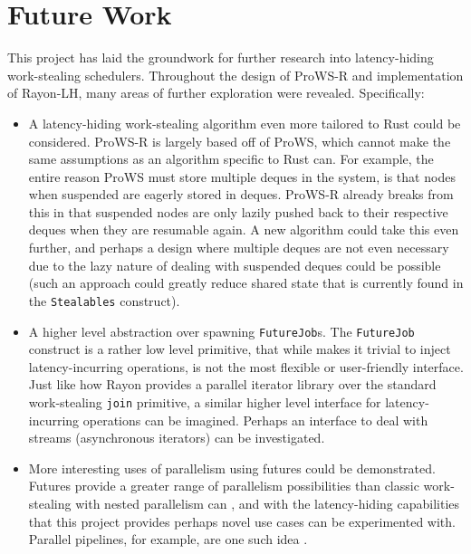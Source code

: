 \documentclass[bsc,frontabs,singlespacing,parskip,deptreport,normalheadings]{infthesis}
\begin{document}
\section{Future Work}

This project has laid the groundwork for further research into latency-hiding
work-stealing schedulers. Throughout the design of ProWS-R and implementation of
Rayon-LH, many areas of further exploration were revealed. Specifically:

\begin{itemize}
    \item A latency-hiding work-stealing algorithm even more tailored to Rust
        could be considered. ProWS-R is largely based off of ProWS, which cannot
        make the same assumptions as an algorithm specific to Rust can. For
        example, the entire reason ProWS must store multiple deques in the
        system, is that nodes when suspended are eagerly stored in deques.
        ProWS-R already breaks from this in that suspended nodes are only lazily
        pushed back to their respective deques when they are resumable again. A
        new algorithm could take this even further, and perhaps a design where
        multiple deques are not even necessary due to the lazy nature of dealing
        with suspended deques could be possible (such an approach could greatly
        reduce shared state that is currently found in the \texttt{Stealables}
        construct).
    \item A higher level abstraction over spawning \texttt{FutureJob}s. The
        \texttt{FutureJob} construct is a rather low level primitive, that while
        makes it trivial to inject latency-incurring operations, is not the most
        flexible or user-friendly interface. Just like how Rayon provides a
        parallel iterator library over the standard work-stealing \texttt{join}
        primitive, a similar higher level interface for latency-incurring
        operations can be imagined. Perhaps an interface to deal with streams
        (asynchronous iterators) can be investigated.
    \item More interesting uses of parallelism using futures could be
        demonstrated. Futures provide a greater range of parallelism
        possibilities than classic work-stealing with nested parallelism can
        \cite{spoonhower_beyond_2009}, and with the latency-hiding capabilities
        that this project provides perhaps novel use cases can be experimented
        with. Parallel pipelines, for example, are one such idea
        \cite{noauthor_pipelining_nodate}.
\end{itemize}
\end{document}
